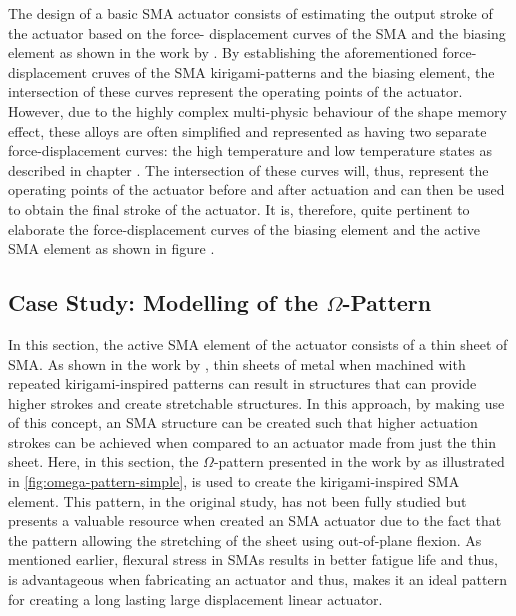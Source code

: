 The design of a basic SMA actuator consists of estimating the output stroke of the actuator based on the force- displacement curves of the SMA and the biasing element as shown in the work by \todocite. By establishing the aforementioned force-displacement cruves of the SMA kirigami-patterns and the biasing element, the intersection of these curves represent the operating points of the actuator. However, due to the highly complex multi-physic behaviour of the shape memory effect, these alloys are often simplified and represented as having two separate force-displacement curves: the high temperature and low temperature states as described in chapter \todocite. The intersection of these curves will, thus, represent the operating points of the actuator before and after actuation and can then be used to obtain the final stroke of the actuator. It is, therefore, quite pertinent to elaborate the force-displacement curves of the biasing element and the active SMA element as shown in figure \todocite.

\subsection{Case Study: Modelling of the $\Omega$-Pattern}
In this section, the active SMA element of the actuator consists of a thin sheet of SMA. As shown in the work by \cite{morikawaUltrastretchableKirigamiBioprobes2018}, thin sheets of metal when machined with repeated kirigami-inspired patterns can result in structures that can provide higher strokes and create stretchable structures. In this approach, by making use of this concept, an SMA structure can be created such that higher actuation strokes can be achieved when compared to an actuator made from just the thin sheet. Here, in this section, the $\Omega$-pattern presented in the work by \cite{shyuKirigamiApproachEngineering2015} as illustrated in \cref{fig:omega-pattern-simple}, is used to create the kirigami-inspired SMA element. This pattern, in the original study, has not been fully studied but presents a valuable resource when created an SMA actuator due to the fact that the pattern allowing the stretching of the sheet using out-of-plane flexion. As mentioned earlier, flexural stress in SMAs results in better fatigue life and thus, is advantageous when fabricating an actuator and thus, makes it an ideal pattern for creating a long lasting large displacement linear actuator.

